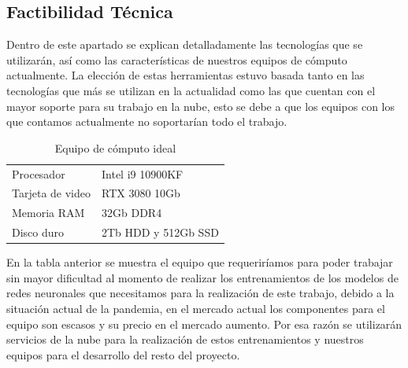 \documentclass[12pt, a4paper, titlepage]{report}
\begin{document}
    	\subsection{Factibilidad Técnica}
    	
    	Dentro de este apartado se explican detalladamente las tecnologías que se utilizarán, así como las características de nuestros equipos de cómputo actualmente. La elección de estas herramientas estuvo basada tanto en las tecnologías que más se utilizan en la actualidad como las que cuentan con el mayor soporte para su trabajo en la nube, esto se debe a que los equipos con los que contamos actualmente no soportarían todo el trabajo.
    	    	
    	\begin{table}[H]
    		\begin{tabular}{|p{3.5cm}||p{10cm}|}
    			\rowcolor{guindapoli}
    			\multicolumn{2}{|c|}{\textbf{\textcolor{white}{Equipo de cómputo ideal.}}}\\
    			\hline
    			\rowcolor{azulclaro}Procesador & Intel i9 10900KF\\
    			\hline
    			\rowcolor{white}Tarjeta de video & RTX 3080 10Gb\\
    			\hline
    			\rowcolor{azulclaro}Memoria RAM & 32Gb DDR4\\
    			\hline
    			\rowcolor{white}Disco duro & 2Tb HDD y 512Gb SSD\\
    			\hline
    		\end{tabular}
    		\caption[Equipo de cómputo ideal]{Equipo de cómputo ideal}
    	\end{table}
    	
    	En la tabla anterior se muestra el equipo que requeriríamos para poder trabajar sin mayor dificultad al momento de realizar los entrenamientos de los modelos de redes neuronales que necesitamos para la realización de este trabajo, debido a la situación actual de la pandemia, en el mercado actual los componentes para el equipo son escasos y su precio en el mercado aumento. Por esa razón se utilizarán servicios de la nube para la realización de estos entrenamientos y nuestros equipos para el desarrollo del resto del proyecto.
    	
\end{document}
